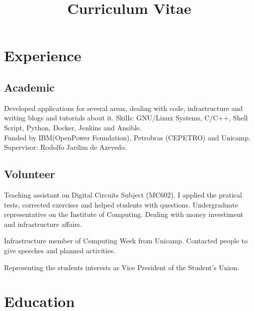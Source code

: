 \documentclass[10pt, a4paper, roman]{moderncv} %
\title{Curriculum Vitae}
\begin{document}
\makecvtitle %

\section{Experience}

\subsection{Academic}
{
    Developed applications for several areas, dealing with code, infrastructure and writing blogs and tutorials about it.
    Skills: GNU/Linux Systems, C/C++, Shell Script, Python, Docker, Jenkins and Ansible.\\ 
    Funded by IBM(OpenPower Foundation), Petrobras (CEPETRO) and Unicamp.\\
    Supervisor: Rodolfo Jardim de Azevedo.
}

\bigskip

\subsection{Volunteer}
{
    Teaching assistant on Digital Circuits Subject (MC602). I applied the pratical tests, corrected exercises
    and helped students with questions.
}
{ 
    Undergraduate representative on the Institute of Computing. Dealing with money investiment and infrastructure 
    affairs.
}

{
    Infrastructure member of Computing Week from Unicamp. Contacted people to give speeches and planned activities.
}


{
    Representing the students interests as Vice President of the Student's Union.
}

\section{Education}

\end{document}

